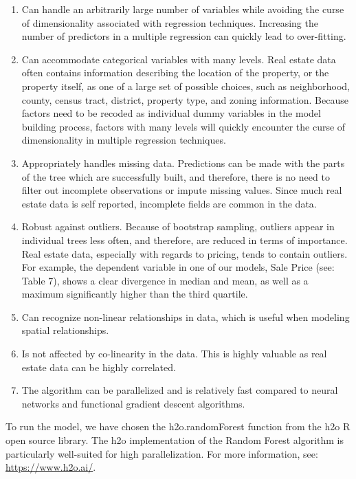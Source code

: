 \documentclass[]{article}
\providecommand{\tightlist}{%
  \setlength{\itemsep}{0pt}\setlength{\parskip}{0pt}}
\begin{document}
\begin{enumerate}
\def\labelenumi{\arabic{enumi}.}
\tightlist
\item
  Can handle an arbitrarily large number of variables while avoiding the
  curse of dimensionality associated with regression techniques.
  Increasing the number of predictors in a multiple regression can
  quickly lead to over-fitting.
\item
  Can accommodate categorical variables with many levels. Real estate
  data often contains information describing the location of the
  property, or the property itself, as one of a large set of possible
  choices, such as neighborhood, county, census tract, district,
  property type, and zoning information. Because factors need to be
  recoded as individual dummy variables in the model building process,
  factors with many levels will quickly encounter the curse of
  dimensionality in multiple regression techniques.
\item
  Appropriately handles missing data. Predictions can be made with the
  parts of the tree which are successfully built, and therefore, there
  is no need to filter out incomplete observations or impute missing
  values. Since much real estate data is self reported, incomplete
  fields are common in the data.
\item
  Robust against outliers. Because of bootstrap sampling, outliers
  appear in individual trees less often, and therefore, are reduced in
  terms of importance. Real estate data, especially with regards to
  pricing, tends to contain outliers. For example, the dependent
  variable in one of our models, Sale Price (see: Table 7), shows a
  clear divergence in median and mean, as well as a maximum
  significantly higher than the third quartile.
\item
  Can recognize non-linear relationships in data, which is useful when
  modeling spatial relationships.
\item
  Is not affected by co-linearity in the data. This is highly valuable
  as real estate data can be highly correlated.
\item
  The algorithm can be parallelized and is relatively fast compared to
  neural networks and functional gradient descent algorithms.
\end{enumerate}

To run the model, we have chosen the h2o.randomForest function from the
h2o R open source library. The h2o implementation of the Random Forest
algorithm is particularly well-suited for high parallelization. For more
information, see: \url{https://www.h2o.ai/}.
\end{document}
